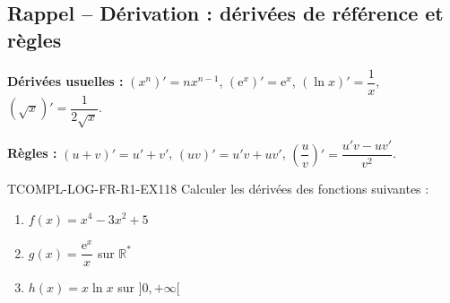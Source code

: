 

\subsection*{Rappel -- Dérivation : dérivées de référence et règles}

\textbf{Dérivées usuelles :} $(x^n)' = n x^{n-1}$, $(\mathrm{e}^x)' = \mathrm{e}^x$, $(\ln x)' = \dfrac{1}{x}$, $(\sqrt{x})' = \dfrac{1}{2\sqrt{x}}$.

\textbf{Règles :} $(u+v)' = u' + v'$, $(uv)' = u'v + uv'$, $\left(\dfrac{u}{v}\right)' = \dfrac{u'v - uv'}{v^2}$.

\begin{exercice}{TCOMPL-LOG-FR-R1-EX1}{1}{8}
Calculer les dérivées des fonctions suivantes :
\begin{enumerate}
  \item $f(x) = x^4 - 3x^2 + 5$
  \item $g(x) = \dfrac{\mathrm{e}^x}{x}$ sur $\mathbb{R}^*$
  \item $h(x) = x \ln x$ sur $]0, +\infty[$
\end{enumerate}
\end{exercice}

